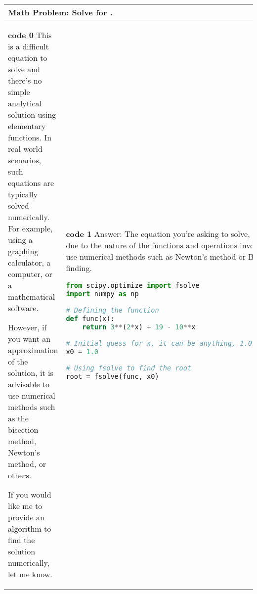 \documentclass{article} \usepackage{iclr2023_conference,times}
\begin{document}
\begin{table*}[ht]
    \centering
    \begin{tabular}{p{}|p{}|p{}}
    \toprule
     \multicolumn{3}{p{0.90\textwidth}}{\small \textbf{Math Problem}: Solve for .} \\
     
    \midrule

    \small \textbf{code 0} 
\newline\newline
    \lstset{style=mystyle}
    \small
     This is a difficult equation to solve and there's no simple analytical solution using elementary functions. In real world scenarios, such equations are typically solved numerically. For example, using a graphing calculator, a computer, or a mathematical software.

However, if you want an approximation of the solution, it is advisable to use numerical methods such as the bisection method, Newton's method, or others.

If you would like me to provide an algorithm to find the solution numerically, let me know.
\small
&
    \small \textbf{code 1} \newline
    \newline
    \small Answer: \newline
     \small  
The equation you're asking to solve, , cannot be solved algebraically due to the nature of the functions and operations involved. Therefore, we'll need to use numerical methods such as Newton's method or Bisection method for root finding.\newline

\lstset{style=mystyle}
     \begin{lstlisting}[language=Python]
from scipy.optimize import fsolve
import numpy as np

# Defining the function
def func(x):
    return 3**(2*x) + 19 - 10**x

# Initial guess for x, it can be anything, 1.0 is chosen arbitrarily here
x0 = 1.0

# Using fsolve to find the root
root = fsolve(func, x0)


\end{lstlisting}
\end{tabular}
\end{table*}
\end{document}
